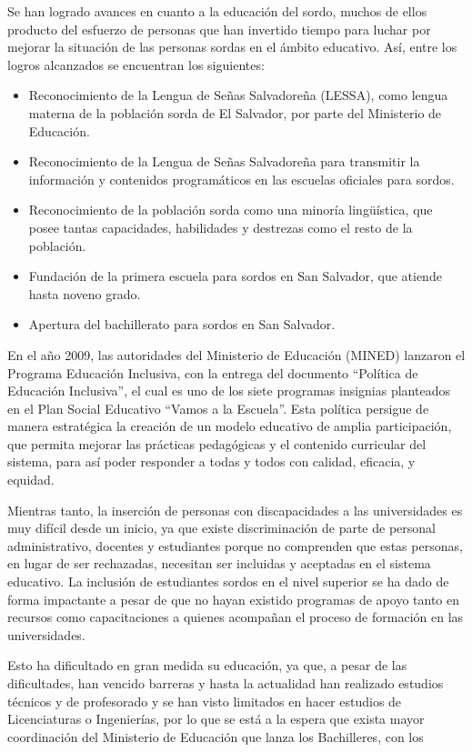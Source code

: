 \documentclass[12pt]{report}%
\begin{document}
Se han logrado avances en cuanto a la educación del sordo, muchos de ellos producto del esfuerzo de personas que han invertido tiempo para luchar por mejorar la situación de las personas sordas en el ámbito educativo. Así, entre los logros alcanzados se encuentran los siguientes:

\begin{itemize}
\item Reconocimiento de la Lengua de Señas Salvadoreña (LESSA), como lengua materna de la población sorda de El Salvador, por parte del Ministerio de Educación.
\item Reconocimiento de la Lengua de Señas Salvadoreña para transmitir la información y contenidos programáticos en las escuelas oficiales para sordos.
\item Reconocimiento de la población sorda como una minoría lingüística, que posee tantas capacidades, habilidades y destrezas como el resto de la población.
\item Fundación de la primera escuela para sordos en San Salvador, que atiende hasta
noveno grado.
\item Apertura del bachillerato para sordos en San Salvador.
\end{itemize}

En el año 2009, las autoridades del Ministerio de Educación (MINED) lanzaron el Programa Educación Inclusiva, con la entrega del documento “Política de Educación Inclusiva”, el cual es uno de los siete programas insignias planteados en el Plan Social Educativo “Vamos a la Escuela”. Esta política persigue de manera estratégica la creación de un modelo educativo de amplia participación, que permita mejorar las prácticas pedagógicas y el contenido curricular del sistema, para así poder responder a todas y todos con calidad, eficacia, y equidad.

Mientras tanto, la inserción de personas con discapacidades a las universidades es muy difícil desde un inicio, ya que existe discriminación de parte de personal administrativo, docentes y estudiantes porque no comprenden que estas personas, en lugar de ser rechazadas, necesitan ser incluidas y aceptadas en el sistema educativo. La inclusión de estudiantes sordos en el nivel superior se ha dado de forma impactante a pesar de que no hayan existido programas de apoyo tanto en recursos como capacitaciones a quienes acompañan el proceso de formación en las universidades. 

Esto ha dificultado en gran medida su educación, ya que, a pesar de las dificultades, han vencido barreras y hasta la actualidad han realizado estudios técnicos y de profesorado y se han visto limitados en hacer estudios de Licenciaturas o Ingenierías, por lo que se está a la espera que exista mayor coordinación del Ministerio de Educación que lanza los Bachilleres, con los
\end{document}
